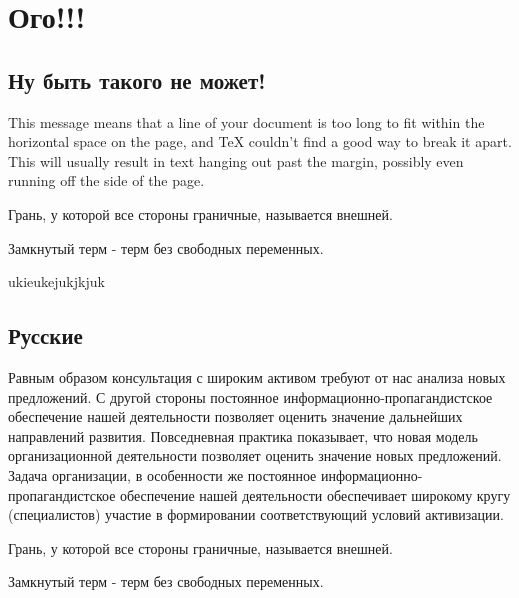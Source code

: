 \documentclass[17pt, a4paper]{extarticle}
\begin{document}
\newpage

\section{Ого!!!}

\subsection{Ну быть такого не может!}

This message means that a line of your document is too long to fit within the
horizontal space on the page, and TeX couldn't find a good way to break
it apart. This will usually result in text hanging out past the margin, possibly
even running off the side of the page.

\begin{define}
Грань, у которой все стороны граничные, называется внешней.
\end{define}

\begin{define}
Замкнутый терм - терм без свободных переменных.
\end{define}

\begin{example}
ukieukejukjkjuk
\end{example}

\newpage

\subsection{Русские}

Равным образом консультация с широким активом требуют от нас анализа новых предложений. С другой стороны постоянное информационно-пропагандистское
обеспечение нашей деятельности позволяет оценить значение дальнейших направлений развития. Повседневная практика показывает, что новая модель
организационной деятельности позволяет оценить значение новых предложений. Задача организации, в особенности же постоянное информационно-пропагандистское
обеспечение нашей деятельности обеспечивает широкому кругу (специалистов) участие в формировании соответствующий условий активизации.

\begin{define}
Грань, у которой все стороны граничные, называется внешней.
\end{define}

\begin{define}
Замкнутый терм - терм без свободных переменных.
\end{define}
\end{document}
